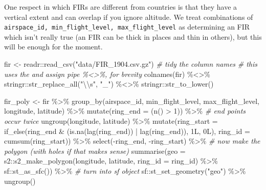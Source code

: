 \documentclass[
]{book}
\newenvironment{Shaded}{\begin{snugshade}}{\end{snugshade}}
\newcommand{\AttributeTok}[1]{\textcolor[rgb]{0.77,0.63,0.00}{#1}}
\newcommand{\CommentTok}[1]{\textcolor[rgb]{0.56,0.35,0.01}{\textit{#1}}}
\newcommand{\DecValTok}[1]{\textcolor[rgb]{0.00,0.00,0.81}{#1}}
\newcommand{\FunctionTok}[1]{\textcolor[rgb]{0.00,0.00,0.00}{#1}}
\newcommand{\NormalTok}[1]{#1}
\newcommand{\OtherTok}[1]{\textcolor[rgb]{0.56,0.35,0.01}{#1}}
\newcommand{\SpecialCharTok}[1]{\textcolor[rgb]{0.00,0.00,0.00}{#1}}
\newcommand{\StringTok}[1]{\textcolor[rgb]{0.31,0.60,0.02}{#1}}
\begin{document}
One respect in which FIRs are different from countries is that they have a vertical extent and can overlap if you ignore altitude. We treat combinations of \texttt{airspace\_id,\ min\_flight\_level,\ max\_flight\_level} as determining an FIR which isn't really true (an FIR can be thick in places and thin in others), but this will be enough for the moment.

\begin{Shaded}
\begin{Highlighting}[]
\NormalTok{fir }\OtherTok{\textless{}{-}}\NormalTok{ readr}\SpecialCharTok{::}\FunctionTok{read\_csv}\NormalTok{(}\StringTok{"data/FIR\_1904.csv.gz"}\NormalTok{)}
\CommentTok{\# tidy the column names}
\CommentTok{\# this uses the \textquotesingle{}and assign\textquotesingle{} pipe \%\textless{}\textgreater{}\%, for brevity}
\FunctionTok{colnames}\NormalTok{(fir) }\SpecialCharTok{\%\textless{}\textgreater{}\%}
\NormalTok{  stringr}\SpecialCharTok{::}\FunctionTok{str\_replace\_all}\NormalTok{(}\StringTok{"}\SpecialCharTok{\textbackslash{}\textbackslash{}}\StringTok{s"}\NormalTok{, }\StringTok{"\_"}\NormalTok{) }\SpecialCharTok{\%\textless{}\textgreater{}\%}
\NormalTok{  stringr}\SpecialCharTok{::}\FunctionTok{str\_to\_lower}\NormalTok{()}

\NormalTok{fir\_poly }\OtherTok{\textless{}{-}}\NormalTok{ fir }\SpecialCharTok{\%\textgreater{}\%} 
  \FunctionTok{group\_by}\NormalTok{(airspace\_id, min\_flight\_level, max\_flight\_level, }
\NormalTok{           longitude, latitude) }\SpecialCharTok{\%\textgreater{}\%} 
  \FunctionTok{mutate}\NormalTok{(}\AttributeTok{ring\_end =}\NormalTok{ (}\FunctionTok{n}\NormalTok{() }\SpecialCharTok{\textgreater{}} \DecValTok{1}\NormalTok{)) }\SpecialCharTok{\%\textgreater{}\%} \CommentTok{\# end points occur twice }
  \FunctionTok{ungroup}\NormalTok{(longitude, latitude) }\SpecialCharTok{\%\textgreater{}\%} 
  \FunctionTok{mutate}\NormalTok{(}\AttributeTok{ring\_start =} \FunctionTok{if\_else}\NormalTok{(ring\_end }\SpecialCharTok{\&}
\NormalTok{                                (}\FunctionTok{is.na}\NormalTok{(}\FunctionTok{lag}\NormalTok{(ring\_end)) }\SpecialCharTok{|} \FunctionTok{lag}\NormalTok{(ring\_end)), }
\NormalTok{                              1L, 0L), }
         \AttributeTok{ring\_id =} \FunctionTok{cumsum}\NormalTok{(ring\_start)) }\SpecialCharTok{\%\textgreater{}\%} 
  \FunctionTok{select}\NormalTok{(}\SpecialCharTok{{-}}\NormalTok{ring\_end, }\SpecialCharTok{{-}}\NormalTok{ring\_start) }\SpecialCharTok{\%\textgreater{}\%} 
  \CommentTok{\# now make the polygon (with holes if that makes sense) }
  \FunctionTok{summarise}\NormalTok{(}\AttributeTok{geo =}\NormalTok{ s2}\SpecialCharTok{::}\FunctionTok{s2\_make\_polygon}\NormalTok{(longitude, latitude, }\AttributeTok{ring\_id =}\NormalTok{ ring\_id) }\SpecialCharTok{\%\textgreater{}\%} 
\NormalTok{            sf}\SpecialCharTok{::}\FunctionTok{st\_as\_sfc}\NormalTok{()) }\SpecialCharTok{\%\textgreater{}\%} 
  \CommentTok{\# turn into sf object}
\NormalTok{  sf}\SpecialCharTok{::}\FunctionTok{st\_set\_geometry}\NormalTok{(}\StringTok{"geo"}\NormalTok{) }\SpecialCharTok{\%\textgreater{}\%}
  \FunctionTok{ungroup}\NormalTok{()}
\end{Highlighting}
\end{Shaded}
\end{document}
